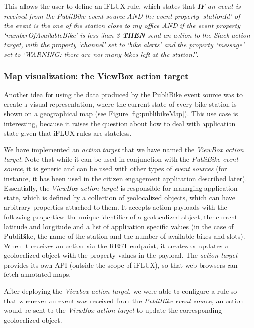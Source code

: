 This allows the user to define an iFLUX rule, which states that \emph{\textbf{IF} an event is received from the PubliBike event source AND the event property `stationId' of the event is the one of the station close to my office AND if the event property `numberOfAvailableBike' is less than 3 \textbf{THEN} send an action to the Slack action target, with the property `channel' set to `bike alerts' and the property `message' set to `WARNING: there are not many bikes left at the station!'}. 

\subsubsection{Map visualization: the ViewBox action target}
Another idea for using the data produced by the PubliBike event source was to create a visual representation, where the current state of every bike station is shown on a geographical map (see Figure \ref{fig:publibikeMap}). This use case is interesting, because it raises the question about how to deal with application state given that iFLUX rules are stateless.

We have implemented an \emph{action target} that we have named the \emph{ViewBox action target}. Note that while it can be used in conjunction with the \emph{PubliBike event source}, it is generic and can be used with other types of \emph{event sources} (for instance, it has been used in the citizen engagement application described later). Essentially, the \emph{ViewBox action target} is responsible for managing application state, which is defined by a collection of geolocalized objects, which can have arbitrary properties attached to them. It accepts action payloads with the following properties: the unique identifier of a geolocalized object, the current latitude and longitude and a list of application specific values (in the case of PubliBike, the name of the station and the number of available bikes and slots). When it receives an action via the REST endpoint, it creates or updates a geolocalized object with the property values in the payload. The \emph{action target} provides its own API (outside the scope of iFLUX), so that web browsers can fetch annotated maps. 

After deploying the \emph{Viewbox action target}, we were able to configure a rule so that whenever an event was received from the \emph{PubliBike event source}, an action would be sent to the \emph{ViewBox action target} to update the corresponding geolocalized object.


